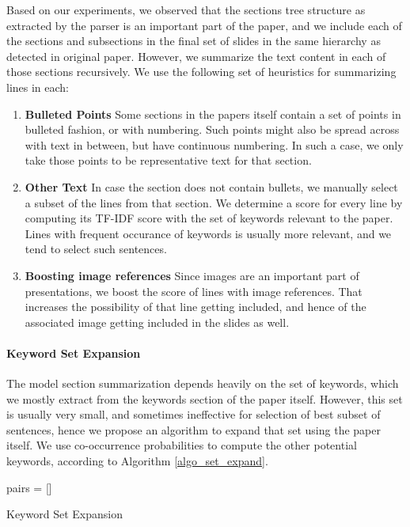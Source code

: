 Based on our experiments, we observed that the sections tree structure as extracted
by the parser is an important part of the paper, and we include each of the sections
and subsections in the final set of slides in the same hierarchy as detected
in original paper. However, we summarize the text content in each of those sections
recursively. We use the following set of heuristics for summarizing lines in each:
\begin{enumerate}
	\item \textbf{Bulleted Points} Some sections in the papers itself contain a set of
	points in bulleted fashion, or with numbering. Such points might also be spread
	across with text in between, but have continuous numbering. In such a case, we
	only take those points to be representative text for that section.
	\item \textbf{Other Text} In case the section does not contain bullets, we manually
	select a subset of the lines from that section. We determine a score for every line
	by computing its TF-IDF score with the set of keywords relevant to the paper. 
	Lines with frequent occurance of keywords is usually more relevant, and 
	we tend to select such sentences.
	\item \textbf{Boosting image references} Since images are an important 
	part of presentations, we boost the score of lines with image references.
	That increases the possibility of that line getting included, and hence 
	of the associated image getting included in the slides as well.
\end{enumerate}

\paragraph{Keyword Set Expansion}
The model section summarization depends heavily on the set of keywords, which we
mostly extract from the keywords section of the paper itself. However, this
set is usually very small, and sometimes ineffective for selection of best
subset of sentences, hence we propose an algorithm to expand that set 
using the paper itself. We use co-occurrence probabilities to compute the
other potential keywords, according to Algorithm \ref{algo_set_expand}. 

\begin{algorithm}[H]\label{algo_set_expand}
 \SetLine %
 pairs = []
 \caption{Keyword Set Expansion}
\end{algorithm}

